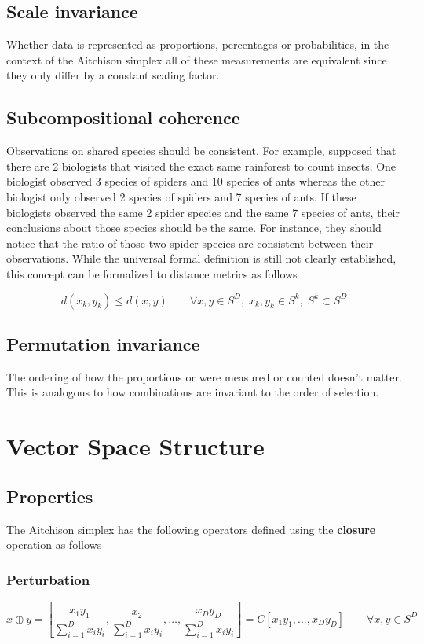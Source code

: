 \subsection{Scale invariance}
Whether data is represented as proportions, percentages or probabilities, in the context of the Aitchison simplex all of these measurements are equivalent since they only differ by a constant scaling factor.

\subsection{Subcompositional coherence}
Observations on shared species should be consistent. For example, supposed that there are 2 biologists that visited the exact same rainforest to count insects.  One biologist observed 3 species of spiders and 10 species of ants whereas the other biologist only observed 2 species of spiders and 7 species of ants.  If these biologists observed the same 2 spider species and the same 7 species of ants, their conclusions about those species should be the same.  For instance, they should notice that the ratio of those two spider species are consistent between their observations.  While the universal formal definition is still not clearly established, this concept can be formalized to distance metrics as follows

  \[
d(x_k, y_k) \leq d(x, y) \qquad
\forall x, y \in S^D, \; x_k, y_k \in S^k, \; S^k \subset S^D
\]

\subsection{Permutation invariance}
The ordering of how the proportions or were measured or counted doesn't matter.  This is analogous to how combinations are invariant to the order of selection.


\section{Vector Space Structure}
\subsection{Properties}
The Aitchison simplex has the following operators defined using the \textbf{closure} operation as follows

\subsubsection{Perturbation}
\[ x \oplus y = [\frac{x_1 y_1}{\sum_{i=1}^D x_i y_i},\frac{x_2}{\sum_{i=1}^D x_i y_i}, \dots,\frac{x_D y_D}{\sum_{i=1}^D x_i y_i}] =
C[x_1 y_1, ..., x_D y_D]  \qquad \forall x, y \in S^D
\]

